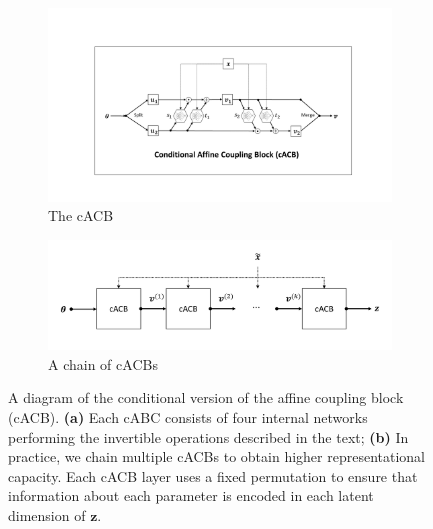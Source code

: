 \documentclass[9pt,twoside,lineno]{pnas-new}
\begin{document}
\begin{figure}
  \begin{subfigure}[b]{0.49\textwidth}
    \includegraphics[width=\textwidth]{acb.png}
    \caption{The cACB}
    \label{fig:Fig.2a}
  \end{subfigure}
  \begin{subfigure}[b]{0.49\textwidth}
    \includegraphics[width=\textwidth]{acbchain.png}
    \caption{A chain of cACBs}
    \label{fig:Fig.2b}
  \end{subfigure}
  \caption{A diagram of the conditional version of the affine coupling block (cACB). \textbf{(a)} Each cABC consists of four internal networks performing the invertible operations described in the text; \textbf{(b)} In practice, we chain multiple cACBs to obtain higher representational capacity. Each cACB layer uses a fixed permutation to ensure that information about each parameter is encoded in each latent dimension of $\boldsymbol{z}$.} \label{fig:Fig.2}
\end{figure}
\end{document}
